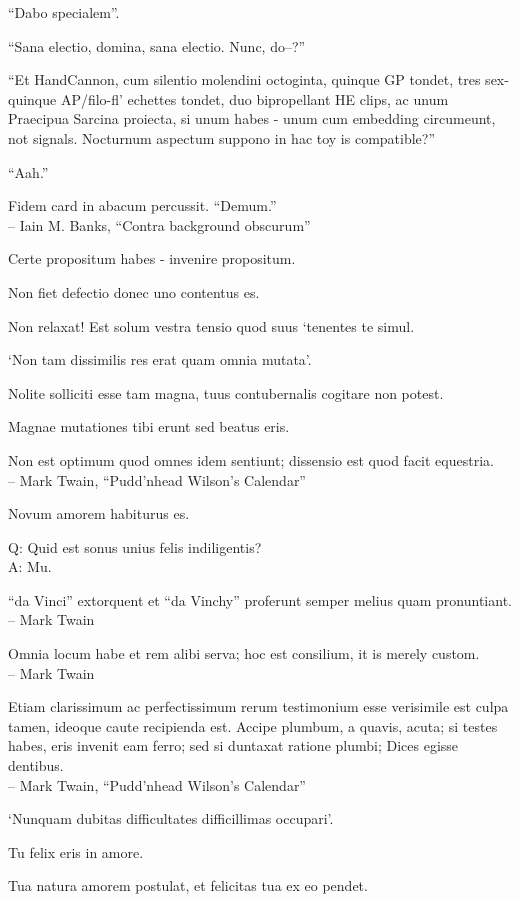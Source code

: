 \documentclass[titlepage,12pt]{memoir}
\begin{document}
“Dabo specialem”.

“Sana electio, domina, sana electio. Nunc, do--?”

“Et HandCannon, cum silentio molendini octoginta, quinque GP tondet, tres
sex-quinque AP/filo-fl’ echettes tondet, duo bipropellant HE clips, ac unum
Praecipua Sarcina proiecta, si unum habes - unum cum embedding
circumeunt, not signals. Nocturnum aspectum suppono in hac toy is
compatible?”

“Aah.”

Fidem card in abacum percussit. “Demum.”
\\-- Iain M. Banks, “Contra background obscurum”

Certe propositum habes - invenire propositum.

Non fiet defectio donec uno contentus es.

Non relaxat! Est solum vestra tensio quod suus ‘tenentes te simul.

‘Non tam dissimilis res erat quam omnia mutata’.

Nolite solliciti esse tam magna, tuus contubernalis cogitare non potest.

Magnae mutationes tibi erunt sed beatus eris.

Non est optimum quod omnes idem sentiunt; dissensio est
quod facit equestria.
\\-- Mark Twain, “Pudd’nhead Wilson’s Calendar”

Novum amorem habiturus es.

Q: Quid est sonus unius felis indiligentis?\\
A: Mu.

“da Vinci” extorquent et “da Vinchy” proferunt
semper melius quam pronuntiant.
\\-- Mark Twain

Omnia locum habe et rem alibi serva; hoc est 
consilium, it is merely custom.
\\-- Mark Twain

Etiam clarissimum ac perfectissimum rerum testimonium esse verisimile est
culpa tamen, ideoque caute recipienda est. Accipe
plumbum, a quavis, acuta; si testes habes, eris
invenit eam ferro; sed si duntaxat ratione plumbi;
Dices egisse dentibus.
\\-- Mark Twain, “Pudd’nhead Wilson’s Calendar”

‘Nunquam dubitas difficultates difficillimas occupari’.

Tu felix eris in amore.

Tua natura amorem postulat, et felicitas tua ex eo pendet.
\end{document}
